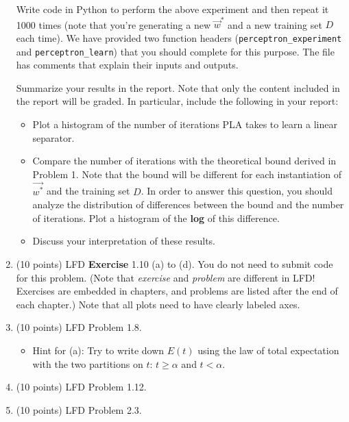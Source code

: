 \documentclass[11pt]{article}
\begin{document}
\begin{enumerate}
  Write code in Python to perform the above experiment and then repeat
  it 1000 times (note that you're generating a new $\vec{w}^*$
  and a new training set $D$ each time). We have provided 
  two function headers (\texttt{perceptron\_experiment} and \texttt{perceptron\_learn}) that you should complete for this
  purpose. The file has comments that explain their inputs and
  outputs. 

  Summarize your results in the report. Note that only the content included in the report will be graded. In particular, include the following in your report:
  \begin{itemize}
    \item Plot a histogram of the number of iterations PLA takes to learn a linear separator.
    \item Compare the number of iterations with the theoretical bound derived in Problem 1. 
  Note that the bound will be different for each instantiation of $\vec{w^*}$ and the training set $D$. 
  In order to answer this question, you should analyze the
  distribution of differences between the bound and the number of
  iterations. Plot a histogram of the \textbf{log} of this difference.
  \item Discuss your interpretation of these results.
  \end{itemize}

\item (10 points) LFD \textbf{Exercise} 1.10 (a) to (d). You do not need to submit code for this problem. (Note that \emph{exercise} and \emph{problem} are different in LFD! Exercises are embedded in chapters, and problems are listed after the end of each chapter.) Note that all plots need to have clearly labeled axes.

\item (10 points) LFD Problem 1.8. 
\begin{itemize}
    \item Hint for (a): Try to write down $E(t)$ using the law of total expectation with the two partitions on $t$: $t\geq\alpha$ and $t<\alpha$.
\end{itemize}

\item (10 points) LFD Problem 1.12.

\item (10 points) LFD Problem 2.3.


\end{enumerate}
\end{document}

